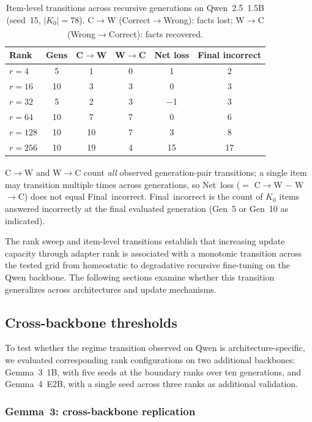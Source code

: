 \documentclass[a4paper,fleqn]{cas-dc}
\newif\ifshowchanges
\newcommand{\rev}[1]{\ifshowchanges{\color{blue}#1}\else{#1}\fi}
\newcommand{\Kcard}{\lvert K_0\rvert}
\renewcommand{\arraystretch}{1.8}
\begin{document}
\begin{table}[!htbp]
\caption{Item-level transitions across recursive generations on
Qwen~2.5~1.5B (seed~15, $\rev{\Kcard = 78}$). C$\to$W (Correct$\to$Wrong): facts lost;
W$\to$C (Wrong$\to$Correct): facts recovered.\textsuperscript{\dag}}\label{tab:transitions}
\footnotesize
\renewcommand{\arraystretch}{1.4}
\begin{tabular}{@{}lccccc@{}}
\toprule
Rank & Gens & C$\to$W & W$\to$C & Net loss & Final incorrect \\
\midrule
$r=4$   & 5  & 1  & 0 & 1  & 2  \\
$r=16$  & 10 & 3  & 3 & 0  & 3  \\
$r=32$  & 5  & 2  & 3 & $-$1 & 3  \\
$r=64$  & 10 & 7  & 7 & 0  & 6  \\
$r=128$ & 10 & 10 & 7 & 3  & 8  \\
$r=256$ & 10 & 19 & 4 & 15 & 17 \\
\bottomrule
\end{tabular}
{\footnotesize\textsuperscript{\dag}C$\to$W and W$\to$C count \emph{all} observed generation-pair
transitions; a single item may transition multiple times across generations, so
Net~loss ($=$ C$\to$W $-$ W$\to$C) does not equal Final~incorrect.
Final~incorrect is the count of $K_0$ items answered incorrectly at the
final evaluated generation (Gen~5 or Gen~10 as indicated).}
\end{table}

The rank sweep and item-level transitions establish that increasing update
capacity through adapter rank \rev{is associated with a monotonic transition across the tested grid}
from homeostatic to degradative recursive fine-tuning on the Qwen backbone. The
following sections examine whether this transition generalizes across
architectures and update mechanisms.

\FloatBarrier
\subsection{Cross-backbone thresholds}\label{sec:res_backbone}

To test whether the regime transition observed on Qwen is architecture-specific,
we evaluated corresponding rank configurations on two additional backbones:
Gemma~3~1B, with five seeds at the boundary ranks over ten generations, and
Gemma~4~E2B, with a single seed across three ranks as additional validation.

\subsubsection{Gemma~3: cross-backbone replication}
\end{document}
